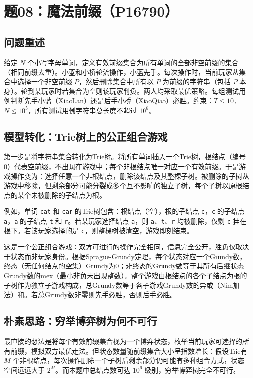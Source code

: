 \section{题08：魔法前缀（P16790）}

\subsection{问题重述}

给定 $N$ 个小写字母单词，定义有效前缀集合为所有单词的全部非空前缀的集合（相同前缀去重）。小蓝和小桥轮流操作，小蓝先手。每次操作时，当前玩家从集合中选择一个非空前缀 $P$，然后删除集合中所有以 $P$ 为前缀的字符串（包括 $P$ 本身）。轮到某玩家时若集合为空则该玩家判负。两人均采取最优策略。每组测试用例判断先手小蓝（XiaoLan）还是后手小桥（XiaoQiao）必胜。约束：$T \le 10$，$N \le 10^5$，所有测试用例字符串总长度不超过 $10^6$。

\subsection{模型转化：Trie树上的公正组合游戏}

第一步是将字符串集合转化为Trie树。将所有单词插入一个Trie树，根结点（编号0）代表空前缀，不出现在游戏中；每个非根结点唯一对应一个有效前缀。于是游戏操作变为：选择任意一个非根结点，删除该结点及其整棵子树。被删除的子树从游戏中移除，但剩余部分可能分裂成多个互不影响的独立子树，每个子树以原根结点的某个未被删除的子结点为根。

例如，单词 \texttt{cat} 和 \texttt{car} 的Trie树包含：根结点（空），根的子结点 \texttt{c}，\texttt{c} 的子结点 \texttt{a}，\texttt{a} 的子结点 \texttt{t} 和 \texttt{r}。若某玩家选择结点 \texttt{a}，则 \texttt{a}、\texttt{t}、\texttt{r} 均被删除，仅剩 \texttt{c} 挂在根下。若该玩家选择的是 \texttt{c}，则整棵树被清空，游戏即刻结束。

这是一个公正组合游戏：双方可进行的操作完全相同，信息完全公开，胜负仅取决于状态而非玩家身份。根据Sprague-Grundy定理，每个状态对应一个Grundy数，终态（无任何结点的空集）Grundy为0；非终态的Grundy数等于其所有后继状态Grundy数的mex（最小非负未出现整数）。整个游戏由根结点的各个子结点为根的子树作为独立子游戏构成，总Grundy数等于各子游戏Grundy数的异或（Nim加法）和。若总Grundy数非零则先手必胜，否则后手必胜。

\subsection{朴素思路：穷举博弈树为何不可行}

最直接的想法是将每个有效前缀集合视为一个博弈状态，枚举当前玩家可选择的所有前缀，模拟双方最优走法。但状态数量随前缀集合大小呈指数增长：假设Trie有 $M$ 个非根结点，每次操作删除一个子树后剩余部分仍可能有多种组合方式，状态空间远远大于 $2^M$。而本题中总结点数可达 $10^6$ 级别，穷举博弈树完全不可行。

